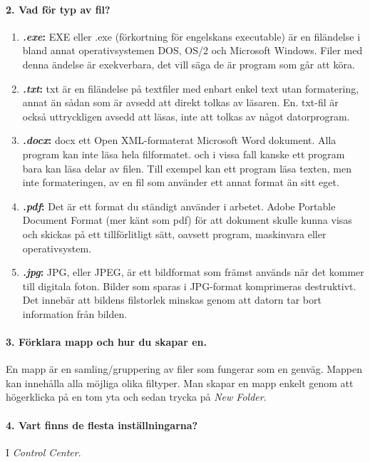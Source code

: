 \paragraph{2. Vad för typ av fil?}
\begin{enumerate}
	\item \textbf{\textit{.exe}:} EXE eller .exe (förkortning för engelskans executable) är en filändelse i bland annat operativsystemen DOS, OS/2 och Microsoft Windows. Filer med denna ändelse är exekverbara, det vill säga de är program som går att köra.
	\item \textbf{\textit{.txt}:} txt är en filändelse på textfiler med enbart enkel text utan formatering, annat än sådan som är avsedd att direkt tolkas av läsaren. En. txt-fil är också uttryckligen avsedd att läsas, inte att tolkas av något datorprogram.
	\item \textbf{\textit{.docx}:} docx ett Open XML-formaterat Microsoft Word dokument. Alla program kan inte läsa hela filformatet. och i vissa fall kanske ett program bara kan läsa delar av filen. Till exempel kan ett program läsa texten, men inte formateringen, av en fil som använder ett annat format än sitt eget.
	\item \textbf{\textit{.pdf}:} Det är ett format du ständigt använder i arbetet. Adobe Portable Document Format (mer känt som pdf) för att dokument skulle kunna visas och skickas på ett tillförlitligt sätt, oavsett program, maskinvara eller operativsystem.
	\item \textbf{\textit{.jpg}:} JPG, eller JPEG, är ett bildformat som främst används när det kommer till digitala foton. Bilder som sparas i JPG-format komprimeras destruktivt. Det innebär att bildens filstorlek minskas genom att datorn tar bort information från bilden.
\end{enumerate}

\paragraph{3. Förklara mapp och hur du skapar en.} En mapp är en samling/gruppering av filer som fungerar som en genväg. Mappen kan innehålla alla möjliga olika filtyper. Man skapar en mapp enkelt genom att högerklicka på en tom yta och sedan trycka på \textit{New Folder}.

\paragraph{4. Vart finns de flesta inställningarna?}
I \textit{Control Center}.

